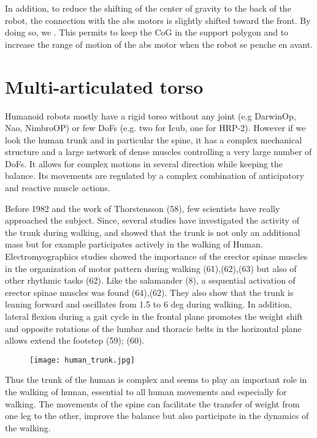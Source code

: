 In addition, to reduce the shifting of the center of gravity to the back of the robot, the connection with the abs motors is slightly shifted toward the front. By doing so, we .
This permits to keep the CoG in the support polygon and to increase the range of motion of the abs motor when the robot se penche en avant.


\section{Multi-articulated torso} %

Humanoid robots mostly have a rigid torso without any joint (e.g DarwinOp, Nao, NimbroOP) or few DoFs (e.g. two for Icub, one for HRP-2). However if we look the human trunk and in particular the spine, it has a complex mechanical structure and a large network of dense muscles controlling a very large number of DoFs. It allows for complex motions in several direction while keeping the balance. Its movements are regulated by a complex combination of anticipatory and reactive muscle actions.

Before 1982 and the work of Thorstensson (58), few scientists have really approached the subject. Since, several studies have investigated the activity of the trunk during walking, and showed that the trunk is not only an additional mass but for example participates actively in the walking of Human.
Electromyographics studies showed the importance of the erector spinae muscles in the organization of motor pattern during walking (61),(62),(63) but also of other rhythmic tasks (62). Like the salamander (8), a sequential activation of erector spinae muscles was found (64),(62).
They also show that the trunk is leaning forward and oscillates from 1.5 to 6 deg during walking. In addition, lateral flexion during a gait cycle in the frontal plane promotes the weight shift and opposite rotations of the lumbar and thoracic belts in the horizontal plane allows extend the footstep (59); (60).

\begin{figure}[ht]
    \begin{center}
        \texttt{[image: human\_trunk.jpg]}
    \end{center}
    \caption{}
    \label{fig:human_spine_system}
\end{figure}

Thus the trunk of the human is complex and seems to play an important role in the walking of human, essential to all human movements and especially for walking. The movements of the spine can facilitate the transfer of weight from one leg to the other, improve the balance but also participate in the dynamics of the walking.

